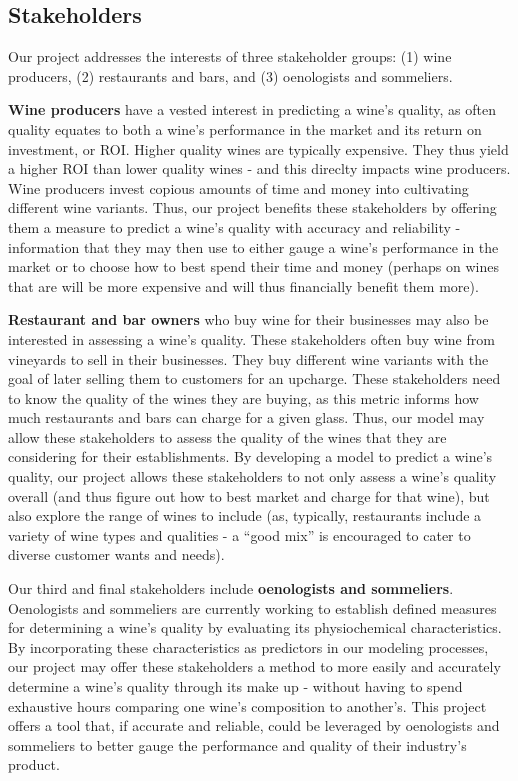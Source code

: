 \documentclass[
  letterpaper,
  DIV=11,
  numbers=noendperiod]{scrartcl}
\begin{document}
\hypertarget{stakeholders}{%
\subsection{Stakeholders}\label{stakeholders}}

Our project addresses the interests of three stakeholder groups: (1)
wine producers, (2) restaurants and bars, and (3) oenologists and
sommeliers.

\textbf{Wine producers} have a vested interest in predicting a wine's
quality, as often quality equates to both a wine's performance in the
market and its return on investment, or ROI. Higher quality wines are
typically expensive. They thus yield a higher ROI than lower quality
wines - and this direclty impacts wine producers. Wine producers invest
copious amounts of time and money into cultivating different wine
variants. Thus, our project benefits these stakeholders by offering them
a measure to predict a wine's quality with accuracy and reliability -
information that they may then use to either gauge a wine's performance
in the market or to choose how to best spend their time and money
(perhaps on wines that are will be more expensive and will thus
financially benefit them more).

\textbf{Restaurant and bar owners} who buy wine for their businesses may
also be interested in assessing a wine's quality. These stakeholders
often buy wine from vineyards to sell in their businesses. They buy
different wine variants with the goal of later selling them to customers
for an upcharge. These stakeholders need to know the quality of the
wines they are buying, as this metric informs how much restaurants and
bars can charge for a given glass. Thus, our model may allow these
stakeholders to assess the quality of the wines that they are
considering for their establishments. By developing a model to predict a
wine's quality, our project allows these stakeholders to not only assess
a wine's quality overall (and thus figure out how to best market and
charge for that wine), but also explore the range of wines to include
(as, typically, restaurants include a variety of wine types and
qualities - a ``good mix'' is encouraged to cater to diverse customer
wants and needs).

Our third and final stakeholders include \textbf{oenologists and
sommeliers}. Oenologists and sommeliers are currently working to
establish defined measures for determining a wine's quality by
evaluating its physiochemical characteristics. By incorporating these
characteristics as predictors in our modeling processes, our project may
offer these stakeholders a method to more easily and accurately
determine a wine's quality through its make up - without having to spend
exhaustive hours comparing one wine's composition to another's. This
project offers a tool that, if accurate and reliable, could be leveraged
by oenologists and sommeliers to better gauge the performance and
quality of their industry's product.
\end{document}
